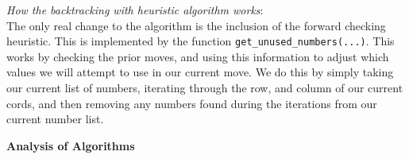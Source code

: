 \documentclass{article}
\begin{document}
\textit{How the backtracking with heuristic algorithm works}: \\

The only real change to the algorithm is the inclusion of the forward checking heuristic.
This is implemented by the function \verb|get_unused_numbers(...)|. This works by checking the prior moves, and
using this information to adjust which values we will attempt to use in our current move. We do this by simply taking our current list 
of numbers, iterating through the row, and column of our current cords, and then removing any numbers found during the iterations from our 
current number list.

\bigskip
\pagebreak

\noindent \textbf{Analysis of Algorithms}

\bigskip




\bigskip
\end{document}
